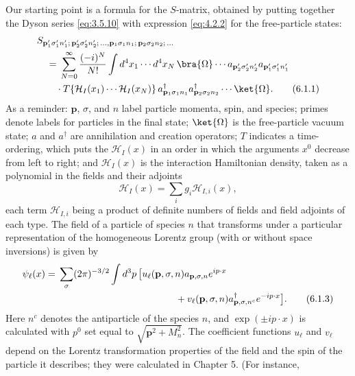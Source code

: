 Our starting point is a formula for the $S$-matrix, obtained by putting
together the Dyson series \eqref{eq:3.5.10} with expression \eqref{eq:4.2.2} for the
free-particle states:
\begin{align}
&S_{\mathbf p'_1\sigma'_1n'_1;\,\mathbf p'_2\sigma'_2n'_2;\,\ldots,
       \mathbf p_1\sigma_1n_1;\,\mathbf p_2\sigma_2n_2;\,\ldots}
\notag\\
&\quad={}
\sum_{N=0}^{\infty}\frac{(-i)^N}{N!}
\int d^4x_1\cdots d^4x_N\,
\bra{\Omega}\cdots
a_{\mathbf p'_2\sigma'_2n'_2}a_{\mathbf p'_1\sigma'_1n'_1}
\notag\\
&\qquad\cdot
T\!\left\{\mathcal H_I(x_1)\cdots\mathcal H_I(x_N)\right\}
a^\dagger_{\mathbf p_1\sigma_1n_1}
a^\dagger_{\mathbf p_2\sigma_2n_2}\cdots\ket{\Omega}.
\tag{6.1.1}
\label{eq:6.1.1}
\end{align}
As a reminder: $\mathbf p$, $\sigma$, and $n$ label particle momenta, spin,
and species; primes denote labels for particles in the final state;
$\ket{\Omega}$ is the free-particle vacuum state; $a$ and $a^\dagger$ are
annihilation and creation operators; $T$ indicates a time-ordering, which puts
the $\mathcal H_I(x)$ in an order in which the arguments $x^0$ decrease from
left to right; and $\mathcal H_I(x)$ is the interaction Hamiltonian density,
taken as a polynomial in the fields and their adjoints
\begin{equation}
\mathcal H_I(x)=\sum_i g_i\mathcal H_{I,i}(x),
\tag{6.1.2}
\label{eq:6.1.2}
\end{equation}
each term $\mathcal H_{I,i}$ being a product of definite numbers of fields and
field adjoints of each type. The field of a particle of species $n$ that
transforms under a particular representation of the homogeneous Lorentz group
(with or without space inversions) is given by
\begin{align}
\psi_\ell(x)={}&\sum_\sigma(2\pi)^{-3/2}\int d^3p\,
\bigl[u_\ell(\mathbf p,\sigma,n)a_{\mathbf p,\sigma,n}e^{ip\cdot x}
\notag\\
&\hspace{43mm}
+v_\ell(\mathbf p,\sigma,n)a^\dagger_{\mathbf p,\sigma,n^c}e^{-ip\cdot x}
\bigr].
\tag{6.1.3}
\label{eq:6.1.3}
\end{align}
Here $n^c$ denotes the antiparticle of the species $n$, and
$\exp(\pm ip\cdot x)$ is calculated with $p^0$ set equal to
$\sqrt{\mathbf p^2+M_n^2}$. The coefficient functions $u_\ell$ and $v_\ell$
depend on the Lorentz transformation properties of the field and the spin of
the particle it describes; they were calculated in Chapter 5. (For instance,
